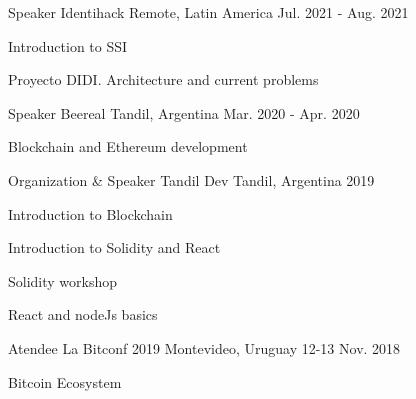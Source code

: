 \begin{cventries}
\cventry
{Speaker} %
{Identihack} %
{Remote, Latin America} %
{Jul. 2021 - Aug. 2021} %
{ %
\begin{cvitems}
\item {Introduction to SSI}
\item {Proyecto DIDI. Architecture and current problems}
\end{cvitems}
}
\cventry
{Speaker} %
{Beereal} %
{Tandil, Argentina} %
{Mar. 2020 - Apr. 2020} %
{ %
\begin{cvitems}
\item {Blockchain and Ethereum development}
\end{cvitems}
}
\cventry
{Organization \& Speaker} %
{Tandil Dev} %
{Tandil, Argentina} %
{2019} %
{ %
\begin{cvitems}
\item {Introduction to Blockchain}
\item {Introduction to Solidity and React}
\item {Solidity workshop}
\item {React and nodeJs basics}
\end{cvitems}
}
\cventry
{Atendee} %
{La Bitconf 2019} %
{Montevideo, Uruguay} %
{12-13 Nov. 2018} %
{ %
\begin{cvitems}
\item {Bitcoin Ecosystem}
\end{cvitems}
}
\end{cventries}
